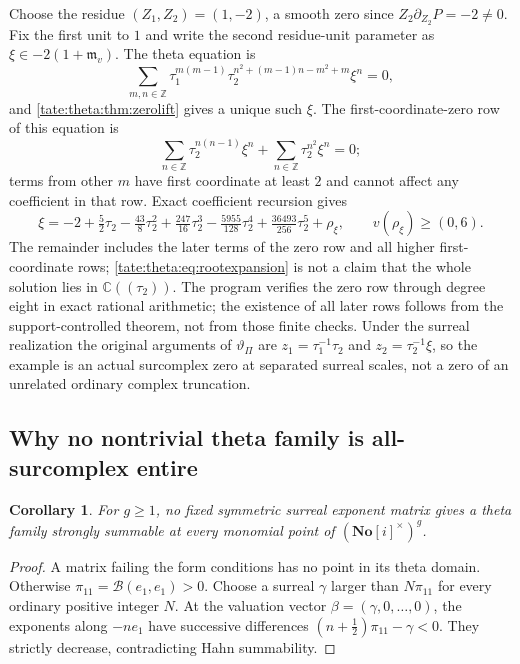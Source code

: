 \documentclass[11pt,letterpaper]{article}
\newtheorem{corollary}[corollary]{Corollary}
\theoremstyle{definition}
\newcommand{\C}{\mathbb C}
\newcommand{\Z}{\mathbb Z}
\newcommand{\No}{\mathbf{No}}
\newcommand{\m}{\mathfrak m}
\newcommand{\cB}{\mathcal B}
\begin{document}
Choose the residue $(Z_1,Z_2)=(1,-2)$, a smooth zero since
$Z_2\partial_{Z_2}P=-2\ne0$. Fix the first unit to $1$ and write the second
residue-unit parameter as $\xi\in-2(1+\m_v)$. The theta equation is
\begin{equation}
 \sum_{m,n\in\Z}\tau_1^{m(m-1)}\tau_2^{n^2+(m-1)n-m^2+m}\xi^n=0,
 \label{tate:theta:eq:coupledtheta}
\end{equation}
and \cref{tate:theta:thm:zerolift} gives a unique such $\xi$. The
first-coordinate-zero row of this equation is
\begin{equation}
 \sum_{n\in\Z}\tau_2^{n(n-1)}\xi^n+\sum_{n\in\Z}\tau_2^{n^2}\xi^n=0;
 \label{tate:theta:eq:zerorow}
\end{equation}
terms from other $m$ have first coordinate at least $2$ and cannot affect
any coefficient in that row. Exact coefficient recursion gives
\begin{equation}
 \xi=-2+\tfrac52\tau_2-\tfrac{43}{8}\tau_2^2+\tfrac{247}{16}\tau_2^3
     -\tfrac{5955}{128}\tau_2^4+\tfrac{36493}{256}\tau_2^5+\rho_\xi,
 \qquad v(\rho_\xi)\ge(0,6).\label{tate:theta:eq:rootexpansion}
\end{equation}
The remainder includes the later terms of the zero row and all higher
first-coordinate rows; \eqref{tate:theta:eq:rootexpansion} is not a claim
that the whole solution lies in $\C((\tau_2))$. The program verifies the
zero row through degree eight in exact rational arithmetic; the existence of
all later rows follows from the support-controlled theorem, not from those
finite checks. Under the surreal realization the original arguments of
$\vartheta_\Pi$ are $z_1=\tau_1^{-1}\tau_2$ and $z_2=\tau_2^{-1}\xi$, so the
example is an actual surcomplex zero at separated surreal scales, not a
zero of an unrelated ordinary complex truncation.

\subsection{Why no nontrivial theta family is all-surcomplex entire}

\begin{corollary}\label{tate:theta:cor:notentire}
For $g\ge1$, no fixed symmetric surreal exponent matrix gives a theta
family strongly summable at every monomial point of $(\No[i]^\times)^g$.
\end{corollary}

\begin{proof}
A matrix failing the form conditions has no point in its theta domain.
Otherwise $\pi_{11}=\cB(e_1,e_1)>0$. Choose a surreal $\gamma$ larger than
$N\pi_{11}$ for every ordinary positive integer $N$. At the valuation
vector $\beta=(\gamma,0,\ldots,0)$, the exponents along $-ne_1$ have
successive differences $(n+\tfrac12)\pi_{11}-\gamma<0$. They strictly
decrease, contradicting Hahn summability.
\end{proof}
\end{document}
